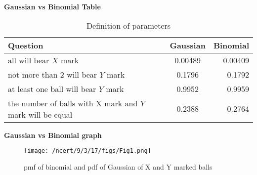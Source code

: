 \documentclass[journal,12pt,twocolumn]{IEEEtran}
\theoremstyle{remark}
\begin{document}
\textbf{Gaussian vs Binomial Table}
\begin{table}[!ht]
\centering
\begin{tabular}{|l|c|r|}
    \hline
    Question & Gaussian & Binomial\\
    \hline
    all will bear $X$ mark & 0.00489 &0.00409\\
    \hline
   not more than 2 will bear $Y$ mark & 0.1796 & 0.1792 \\
    \hline
     at least one ball will bear $Y$ mark &  0.9952& 0.9959 \\
    \hline
    the number of balls with X mark and $Y$ mark will be equal& 0.2388 & 0.2764\\
    \hline
\end{tabular}
\caption{Definition of parameters}
\label{tab:gaussian/9/3/17}
\end{table}

\textbf{Gaussian vs Binomial graph}
\begin{figure}[!ht]
\centering
\texttt{[image: /ncert/9/3/17/figs/Fig1.png]}
\caption{pmf of binomial and pdf of Gaussian of X and Y marked balls}
\end{figure}
\end{document}
